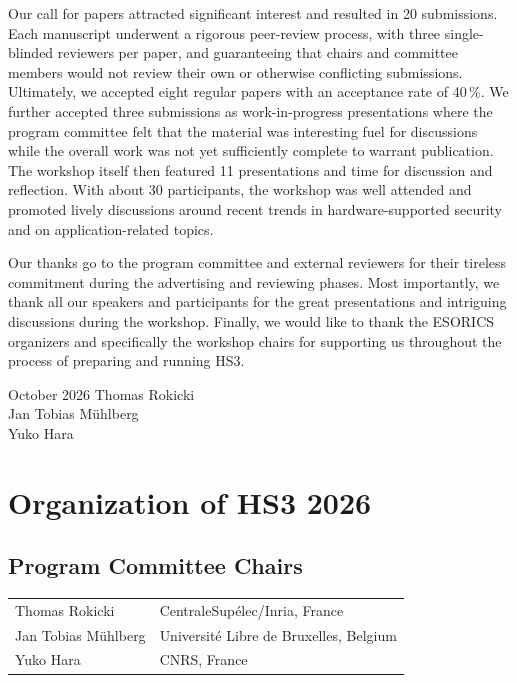 \documentclass[runningheads]{llncs}
\begin{document}
Our call for papers attracted significant interest and resulted in 20
submissions. Each manuscript underwent a rigorous peer-review process, with
three single-blinded reviewers per paper, and guaranteeing that chairs and
committee members would not review their own or otherwise conflicting
submissions. Ultimately, we accepted eight regular papers with an
acceptance rate of 40\,\%. We further accepted three submissions as
work-in-progress presentations where the program committee felt that the
material was interesting fuel for discussions while the overall work was not
yet sufficiently complete to warrant publication.  The workshop itself then
featured 11 presentations and time for discussion and reflection. With
about 30 participants, the workshop was well attended and promoted lively
discussions around recent trends in hardware-supported security and on
application-related topics.

Our thanks go to the program committee and external reviewers for their
tireless commitment during the advertising and reviewing phases.  Most
importantly, we thank all our speakers and participants for the great
presentations and intriguing discussions during the workshop. Finally, we
would like to thank the ESORICS organizers and specifically the workshop
chairs for supporting us throughout the process of preparing and running
HS3.

\medskip

\begin{flushright}
\noindent October 2026\hfill
{Thomas Rokicki} \\
{Jan Tobias M\"uhlberg} \\
{Yuko Hara} \\
\end{flushright}


\chapter*{Organization of HS3 2026}
\setlength{\tabcolsep}{0pt}     %
\setlength{\LTpre}{0pt}         %

\section*{Program Committee Chairs}
\begin{longtable}{p{}p{}}
Thomas Rokicki       & CentraleSup\'elec/Inria, France \\
Jan Tobias M\"uhlberg & Universit\'e Libre de Bruxelles, Belgium \\
Yuko Hara            & CNRS, France \\
\end{longtable}
\end{document}
